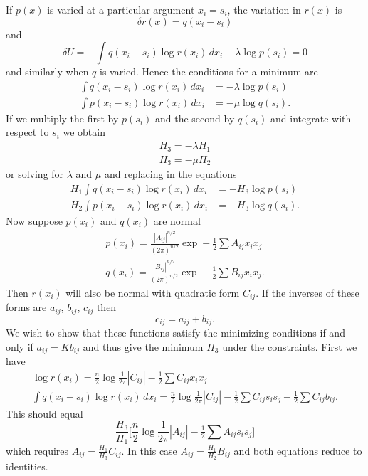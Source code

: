 If $p(x)$ is varied at a particular argument $x_i=s_i$, the variation in
$r(x)$ is
$$
\delta r(x)=q(x_i-s_i)
$$
and
$$
\delta U=-\int q(x_i-s_i)\log r(x_i)\,dx_i-\lambda\log p(s_i)=0
$$
and similarly when $q$ is varied.  Hence the conditions for a minimum are
\begin{align*}
\int q(x_i-s_i)\log r(x_i)\,dx_i
&=-\lambda \log p(s_i)\\
\int p(x_i-s_i)\log r(x_i)\,dx_i
&=-\mu \log q(s_i).
\end{align*}
If we multiply the first by $p(s_i)$ and the second by $q(s_i)$ and
integrate with respect to $s_i$ we obtain
\begin{align*}
H_3=-\lambda H_1\\
H_3=-\mu H_2
\end{align*}
or solving for $\lambda$ and $\mu$ and replacing in the equations
\begin{align*}
H_1\int q(x_i-s_i)\log r(x_i)\,dx_i&=-H_3 \log p(s_i)\\
H_2\int p(x_i-s_i)\log r(x_i)\,dx_i&=-H_3 \log q(s_i).
\end{align*}
Now suppose $p(x_i)$ and $q(x_i)$ are normal
\begin{align*}
p(x_i)=\frac{|A_{ij}|^{n/2}}{(2\pi)^{n/2}}\exp -\tfrac12\sum A_{ij}x_i x_j\\
q(x_i)=\frac{|B_{ij}|^{n/2}}{(2\pi)^{n/2}}\exp -\tfrac12\sum B_{ij}x_i x_j.
\end{align*}
Then $r(x_i)$ will also be normal with quadratic form $C_{ij}$.  If the
inverses of these forms are $a_{ij}$, $b_{ij}$, $c_{ij}$ then
$$
c_{ij}=a_{ij}+b_{ij}.
$$
We wish to show that these functions satisfy the minimizing conditions if
and only if $a_{ij}=Kb_{ij}$ and thus give the minimum $H_3$ under the
constraints.  First we have
\begin{gather*}
\log r(x_i)=\frac{n}{2}\log\frac1{2\pi}|C_{ij}|-\tfrac12\sum C_{ij}x_i x_j\\
\int q(x_i-s_i)\log r(x_i)\,dx_i=\frac{n}{2}\log\frac1{2\pi}|C_{ij}|
	-\tfrac12\sum C_{ij}s_i s_j
	-\tfrac12\sum C_{ij} b_{ij}.
\end{gather*}
This should equal
$$
\frac{H_3}{H_1}\biggl[\frac{n}{2}\log\frac1{2\pi}|A_{ij}|
	-\tfrac12\sum A_{ij}s_i s_j\biggr]
$$
which requires $\displaystyle A_{ij}=\frac{H_1}{H_3}C_{ij}$.  In this case
$\displaystyle A_{ij}=\frac{H_1}{H_2}B_{ij}$ and both equations reduce to
identities.

\section{}
\label{ap:7}


